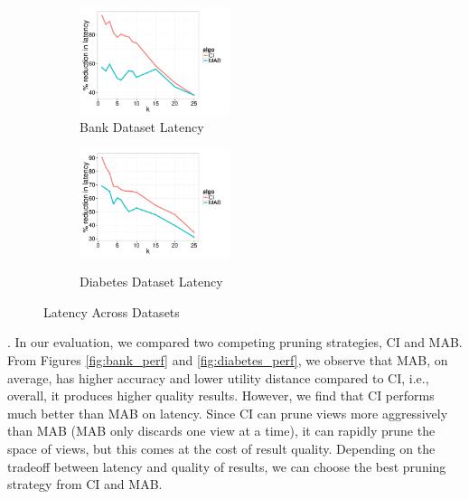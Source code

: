 \begin{figure}[h]
	\centering
	\vspace*{-10pt}
	\begin{subfigure}{0.48\linewidth}
		\centering
		\includegraphics[width=4.4cm] {Images/in_memory_bank_latency.pdf}
		\vspace{-15pt}
		\caption{Bank Dataset Latency}
		\label{fig:bank_latency}
	\end{subfigure}
	\begin{subfigure}{0.48\linewidth}
		\centering
		\includegraphics[width=4.4cm] {Images/in_memory_dia_latency.pdf}\
		\vspace{-15pt}
		\caption{Diabetes Dataset Latency}
		\label{fig:dia_latency}
	\end{subfigure}
	\vspace{-10pt}
	\caption{Latency Across Datasets}
	\vspace{-10pt}
\end{figure}

.
In our evaluation, we compared two competing pruning strategies, CI and MAB. 
From Figures \ref{fig:bank_perf} and \ref{fig:diabetes_perf}, we observe that MAB, 
on average, has higher accuracy and lower utility distance compared to
CI, i.e., overall, it produces higher quality results.
However, we find that CI performs much better than MAB on latency.
Since CI can prune views more aggressively than MAB (MAB only discards one view at a time),
it can rapidly prune the space of views, but this comes at the cost of result quality.
Depending on the tradeoff between latency and quality of results, we can choose the best
pruning strategy from CI and MAB.

